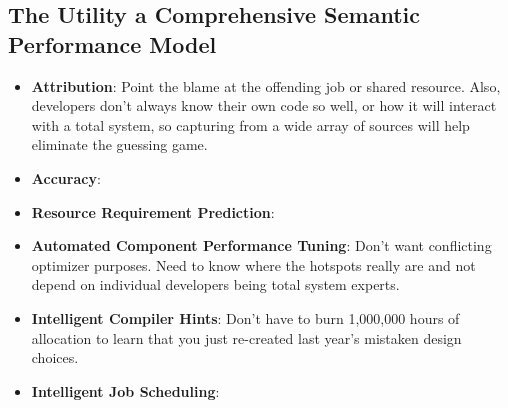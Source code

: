 
\subsection{The Utility a Comprehensive Semantic Performance Model}
\begin{itemize}
\item \textbf{Attribution}: Point the blame at the offending job or shared
  resource. Also, developers don't always know their own code so well,
  or how it will interact with a total system, so capturing from a
  wide array of sources will help eliminate the guessing game.
\item \textbf{Accuracy}:
\item \textbf{Resource Requirement Prediction}:
\item \textbf{Automated Component Performance Tuning}: Don't want conflicting
  optimizer purposes. Need to know where the hotspots really are and
  not depend on individual developers being total system experts.
\item \textbf{Intelligent Compiler Hints}: Don't have to burn 1,000,000 hours
  of allocation to learn that you just re-created last year's mistaken
design choices.
\item \textbf{Intelligent Job Scheduling}:
\end{itemize}

